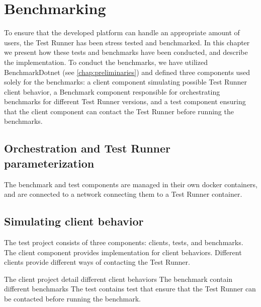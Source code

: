 \chapter{Benchmarking} \label{chap:Benchmarking}
To ensure that the developed platform can handle an appropriate amount of users, the Test Runner has been stress tested and benchmarked.
In this chapter we present how these tests and benchmarks have been conducted, and describe the implementation. To conduct the benchmarks, we have utilized BenchmarkDotnet (see \ref{chap:preliminaries}) and defined three components used solely for the benchmarks:
a client component simulating possible Test Runner client behavior, a Benchmark component responsible for orchestrating benchmarks for different Test Runner versions, and a test component ensuring that the client component can contact the Test Runner before running the benchmarks.

\section{Orchestration and Test Runner parameterization}
The benchmark and test components are managed in their own docker containers, and are connected to a network connecting them to a Test Runner container. 

\section{Simulating client behavior}


The test project consists of three components: clients, tests, and benchmarks.
The client component provides implementation for client behaviors. Different clients provide different ways of contacting the Test Runner.

The client project detail different client behaviors
The benchmark contain different benchmarks
The test contains test that ensure that the Test Runner can be contacted before running the benchmark.